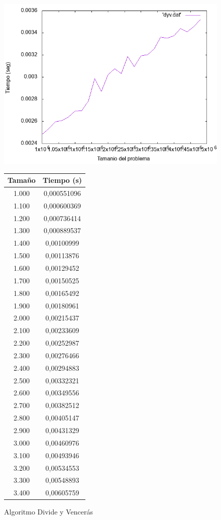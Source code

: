 \documentclass[12pt,spanish]{article}
\begin{document}
\begin{figure}[H]
\centering

\includegraphics[scale=0.75]{dyv.png}

\vskip 0.5cm

\begin{tabular}{|c|c|}
\hline
\textbf{Tamaño} & \textbf{Tiempo (s)} \\
\hline
1.000 & 0,000551096 \\
\hline
1.100 & 0,000600369 \\
\hline
1.200 & 0,000736414 \\
\hline
1.300 & 0,000889537 \\
\hline
1.400 & 0,00100999 \\
\hline
1.500 & 0,00113876 \\
\hline
1.600 & 0,00129452 \\
\hline
1.700 & 0,00150525 \\
\hline
1.800 & 0,00165492 \\
\hline
1.900 & 0,00180961 \\
\hline
2.000 & 0,00215437 \\
\hline
2.100 & 0,00233609 \\
\hline
2.200 & 0,00252987 \\
\hline
2.300 & 0,00276466 \\
\hline
2.400 & 0,00294883 \\
\hline
2.500 & 0,00332321 \\
\hline
2.600 & 0,00349556 \\
\hline
2.700 & 0,00382512 \\
\hline
2.800 & 0,00405147 \\
\hline
2.900 & 0,00431329 \\
\hline
3.000 & 0,00460976 \\
\hline
3.100 & 0,00493946 \\
\hline
3.200 & 0,00534553 \\
\hline
3.300 & 0,00548893 \\
\hline
3.400 & 0,00605759 \\

\hline
\end{tabular}


\caption{Algoritmo Divide y Vencerás}
\end{figure}
\end{document}
